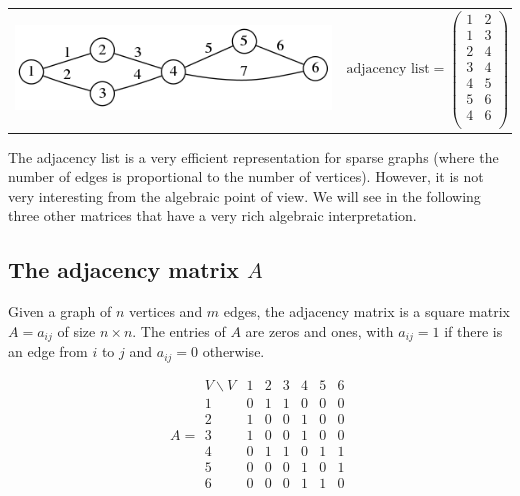 \begin{tabular}{ll}
\includegraphics{graph2.png} &
\vbox{$$
	\textrm{adjacency list} =
	\begin{pmatrix}
		1 & 2 \\
		1 & 3 \\
		2 & 4 \\
		3 & 4 \\
		4 & 5 \\
		5 & 6 \\
		4 & 6 \\
	\end{pmatrix}
$$}
\end{tabular}


The adjacency list is a very efficient representation for sparse graphs (where
the number of edges is proportional to the number of vertices).
However, it is not very interesting from the algebraic point of view.
We will see in the following three other matrices that have a very rich
algebraic interpretation.


\subsection{The adjacency matrix $A$}


Given a graph of $n$ vertices and $m$ edges,
the adjacency matrix is a square matrix $A=a_{ij}$ of size $n\times n$.
The entries of $A$ are zeros and ones, with $a_{ij}=1$ if there is an edge
from $i$ to $j$ and $a_{ij}=0$ otherwise.

$$
A =
\begin{array}{l|lllllll}
	V\backslash V
	  & 1 & 2 & 3 & 4 & 5 & 6 \\
	\hline
	1 & 0 & 1 & 1 & 0 & 0 & 0 \\
	2 & 1 & 0 & 0 & 1 & 0 & 0 \\
	3 & 1 & 0 & 0 & 1 & 0 & 0 \\
	4 & 0 & 1 & 1 & 0 & 1 & 1 \\
	5 & 0 & 0 & 0 & 1 & 0 & 1 \\
	6 & 0 & 0 & 0 & 1 & 1 & 0 \\
\end{array}
$$

